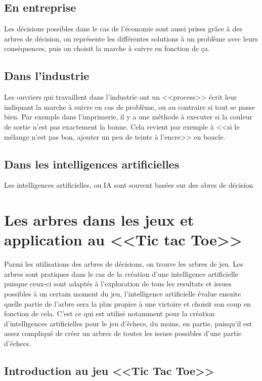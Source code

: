 \documentclass{article}
\begin{document}
\subsection{En entreprise}

Les décisions possibles dans le cas de l'économie sont aussi prises grâce à des
arbres de décision,
on représente les différentes solutions à un problème avec leurs conséquences,
puis on choisit 
la marche à suivre en fonction de ça.

\subsection{Dans l'industrie}

Les ouvriers qui travaillent dans l'industrie ont un <<process>> écrit 
leur indiquant la marche à suivre en cas de problème, 
ou au contraire si tout se passe bien. Par exemple dans l'imprimerie, il y a une
méthode à executer si la 
couleur de sortie n'est pas exactement la bonne.
Cela revient par exemple à <<si le mélange n'est pas bon, ajouter un peu de
teinte à l'encre>> en boucle.


\subsection{Dans les intelligences artificielles}

Les intelligences artificielles, ou IA sont souvent basées sur des abres de
décision 

\pagebreak

\section{Les arbres dans les jeux et application au <<Tic tac Toe>>}

Parmi les utilisations des arbres de décisions, on trouve les arbres de jeu.
Les arbres sont pratiques dans le cas de la création d'une intelligence
artificielle puisque 
ceux-ci sont adaptés à l'exploration
de tous les resultats et issues possibles à un certain moment du jeu,
l'intelligence artificielle évalue ensuite quelle partie de l'arbre sera la plus
propice à une victoire et choisit son coup en fonction de cela. C'est ce qui est
utilisé notamment pour la création d'intelligences
artificielles pour le jeu d'échecs, du moins, en partie, puisqu'il est assez compliqué de créer
 un arbres de toutes les issues possibles d'une partie d'échecs.

\subsection{Introduction au jeu <<Tic Tac Toe>>}
\end{document}
